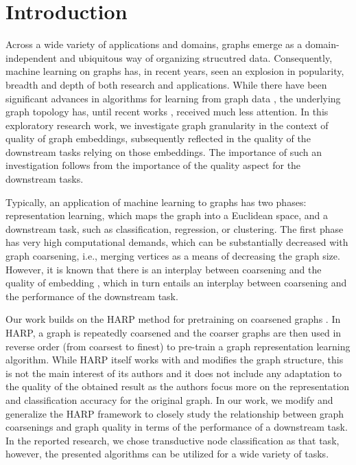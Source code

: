 \section{Introduction}
Across a wide variety of applications and domains, graphs emerge as a domain-independent and ubiquitous way of organizing strucutred data. Consequently, machine learning on graphs has, in recent years, seen an explosion in popularity, breadth and depth of both research and applications. While there have been significant advances in algorithms for learning from graph data \cite{defferrard_convolutional_2016, kipf_semi-supervised_2017}, the underlying graph topology has, until recent works \cite{topping_understanding_2021, velickovic_geometric_2021}, received much less attention. In this exploratory research work, we investigate graph granularity in the context of quality of graph embeddings, subsequently reflected in the quality of the downstream tasks relying on those embeddings. The importance of such an investigation follows from the importance of the quality aspect for the downstream tasks.

Typically, an application of machine learning to graphs has two phases: representation learning, which maps the graph into a Euclidean space, and a downstream task, such as classification, regression, or clustering. The first phase has very high computational demands, which can be substantially decreased with graph coarsening, i.e., merging vertices as a means of decreasing the graph size. However, it is known that there is an interplay between coarsening and the quality of embedding \cite{akyildiz_understanding_2020, makarov_survey_2021}, which in turn entails an interplay between coarsening and the performance of the downstream task.

Our work builds on the HARP method for pretraining on coarsened graphs \cite{chen_harp_2018}. In HARP, a graph is repeatedly coarsened and the coarser graphs are then used in reverse order (from coarsest to finest) to pre-train a graph representation learning algorithm. While HARP itself works with and modifies the graph structure, this is not the main interest of its authors and it does not include any adaptation to the quality of the obtained result as the authors focus more on the representation and classification accuracy for the original graph. In our work, we modify and generalize the HARP framework to closely study the relationship between graph coarsenings and graph quality in terms of the performance of a downstream task. In the reported research, we chose transductive node classification as that task, however, the presented algorithms can be utilized for a wide variety of tasks.

